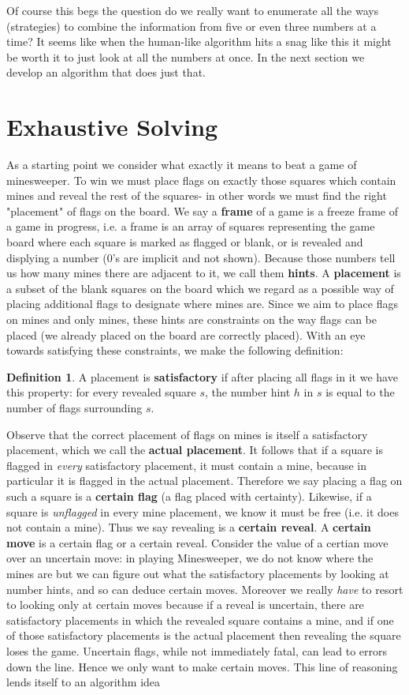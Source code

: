 \documentclass{article}
\theoremstyle{definition}
\newtheorem{definition}{Definition}
\theoremstyle{definition}
\theoremstyle{theorem}
\begin{document}
	Of course this begs the question do we really want to enumerate all the ways (strategies) to combine the information from five or even three numbers at a time? It seems like when the human-like algorithm hits a snag like this it might be worth it to just look at all the numbers at once. In the next section we develop an algorithm that does just that.
	\section*{Exhaustive Solving}
	As a starting point we consider what exactly it means to beat a game of minesweeper. To win we must place flags on exactly those squares which contain mines and reveal the rest of the squares- in other words we must find the right "placement" of flags on the board. We say a  \textbf{frame} of a game is a freeze frame of a game in progress, i.e. a frame is an array of squares representing the game board where each square is marked as flagged or blank, or is revealed and displying a number (0's are implicit and not shown). Because those numbers tell us how many mines there are adjacent to it, we call them \textbf{hints}. A \textbf{placement} is a subset of the blank squares on the board which we regard as a possible way of placing additional flags to designate where mines are. Since we aim to place flags on mines and only mines, these hints are constraints on the way flags can be placed (we already placed on the board are correctly placed). With an eye towards satisfying these constraints, we make the following definition:
	\begin{definition}
		A placement is \textbf{satisfactory} if after placing all flags in it we have this property: for every revealed square $s$, the number hint $h$ in $s$ is equal to the number of flags surrounding $s$.
	\end{definition}
	Observe that the correct placement of flags on mines is itself a satisfactory placement, which we call the \textbf{actual placement}. It follows that if a square is flagged in \textit{every} satisfactory placement, it must contain a mine, because in particular it is flagged in the actual placement. Therefore we say placing a flag on such a square is a \textbf{certain flag} (a flag placed with certainty). Likewise, if a square is \textit{unflagged} in every mine placement, we know it must be free (i.e. it does not contain a mine). Thus we say revealing is a \textbf{certain reveal}. A \textbf{certain move} is a certain flag or a certain reveal. Consider the value of a certian move over an uncertain move: in playing Minesweeper, we do not know where the mines are but we can figure out what the satisfactory placements by looking at number hints, and so can deduce certain moves. Moreover we really \textit{have} to resort to looking only at certain moves because if a reveal is uncertain, there are satisfactory placements in which the revealed square contains a mine, and if one of those satisfactory placements is the actual placement then revealing the square loses the game. Uncertain flags, while not immediately fatal, can lead to errors down the line. Hence we only want to make certain moves. This line of reasoning lends itself to an algorithm idea
\end{document}
